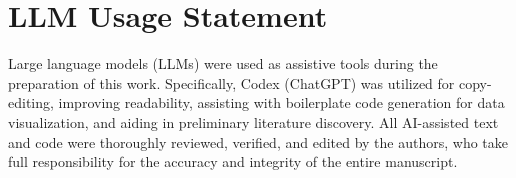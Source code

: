 \clearpage
\section*{LLM Usage Statement}
Large language models (LLMs) were used as assistive tools during the preparation of this work. Specifically, Codex (ChatGPT) was utilized for copy-editing, improving readability, assisting with boilerplate code generation for data visualization, and aiding in preliminary literature discovery. All AI-assisted text and code were thoroughly reviewed, verified, and edited by the authors, who take full responsibility for the accuracy and integrity of the entire manuscript.\par
